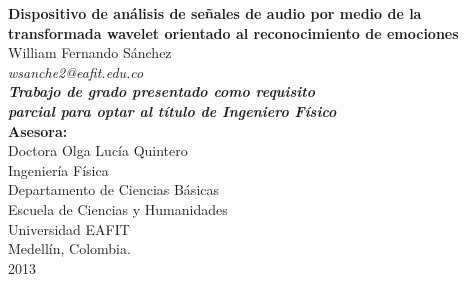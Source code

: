 \documentclass[11pt,lettersize]{article} %
\begin{document}
\thispagestyle{empty} %
\begin{center}
\textbf{{\Large Dispositivo de análisis de señales de audio por medio de la transformada wavelet orientado al reconocimiento de emociones}}\\[3cm]
{\Large William Fernando S\'anchez} \\ {\large \textit{wsanche2@eafit.edu.co}}\\[2.5cm]
{\large\emph{\textbf{Trabajo de grado presentado como requisito }}\\
\emph{\textbf{parcial  para optar al t\'itulo de Ingeniero Físico}}}\\[3cm]
{\large \textbf{Asesora:} \\ Doctora Olga Lucía Quintero}\\[3cm]
Ingenier\'ia F\'isica \\ Departamento de Ciencias Básicas \\ Escuela de Ciencias y Humanidades \\ Universidad EAFIT \\ Medell\'in, Colombia.\\
2013
\end{center}
\pagebreak

\end{document}
